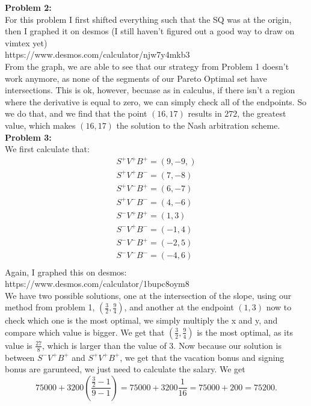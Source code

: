 \documentclass[12pt]{article}
\begin{document}
\noindent
\textbf{Problem 2: } \\
For this problem I first shifted everything such that the SQ was at the origin, then I 
graphed it on desmos (I still haven't figured out a good way to draw on vimtex yet)\\ 
https://www.desmos.com/calculator/njw7y4mkb3 \\
From the graph, we are able to see that our strategy from Problem 1 doesn't work anymore, 
as none of the segments of our Pareto Optimal set have intersections. This is ok, however, becuase as in calculus, 
if there isn't a region where the derivative is equal to zero, we can simply check all of the endpoints. 
So we do that, and we find that the point $(16,17)$ results in $272$, the greatest value, which makes $(16,17)$ the solution to the Nash arbitration
scheme.  \\

\noindent
\textbf{Problem 3: } \\
We first calculate that:
\begin{align*}
	S^{+}V^{+}B^{+} = (9, -9,)\\
	S^{+}V^{+}B^{-} = (7,-8)\\
	S^{+}V^{-}B^{+} = (6, -7)\\
	S^{+}V^{-}B^{-} = (4,-6)\\
	S^{-}V^{+}B^{+} = (1, 3)\\
	S^{-}V^{+}B^{-} = (-1, 4)\\
	S^{-}V^{-}B^{+} = (-2, 5)\\
	S^{-}V^{-}B^{-} = (-4, 6)\\
\end{align*}
Again, I graphed this on desmos: \\
https://www.desmos.com/calculator/1bupc8oym8 \\
We have two possible solutions, one at the intersection of the slope, using our method from problem 1, 
$(\frac{3}{2}, \frac{9}{4})$, and another at the endpoint $(1,3)$ now to check which one is the most optimal,
we simply multiply the x and y, and compare which value is bigger. We get that $(\frac{3}{2}, \frac{9}{4})$ is
the most optimal, as its value is $\frac{27}{8}$, which is larger than the value of $3$. Now because our solution
is between $S^{-}V^{+}B^{+}$ and $S^{+}V^{+}B^{+}$, we get that the vacation bonus and signing bonus are garunteed,
we just need to calculate the salary. We get
\[
75000+3200(\frac{\frac{3}{2}-1}{9-1}) = 75000+3200\frac{1}{16}=75000+200=75200
.\] 
\end{document}

